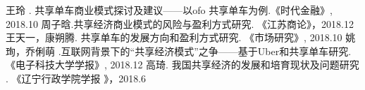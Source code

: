 \documentclass[a4paper,oneside,12pt]{article}
\begin{document}
\begin{thebibliography}{00}
  王玲 . 共享单车商业模式探讨及建议——以ofo 共享单车为例.《时代金融》, 2018.10
   周子晗.共享经济商业模式的风险与盈利方式研究. 《江苏商论》，2018.12
   王天一，康朔腾. 共享单车的发展方向和盈利方式研究. 《市场研究》, 2018.10
   姚珣，乔俐萌 .互联网背景下的“共享经济模式”之争——基于Uber和共享单车研究.《电子科技大学学报》, 2018.12
   高琦. 我国共享经济的发展和培育现状及问题研究 . 《辽宁行政学院学报 》，2018.6
\end{thebibliography}
\end{document}
